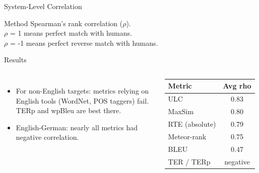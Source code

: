 \begin{frame}{System-Level Correlation}

\begin{block}{Method}
Spearman's rank correlation (\( \rho  \)). \\
    \( \rho  \) = 1 means perfect match with humans.\\
    \( \rho  \) = -1 means perfect reverse match with humans.
\end{block}

\vfill

\begin{block}{Results}
    \begin{columns}
        \begin{itemize}
            \item For non-English targets: metrics relying on English tools (WordNet, POS taggers) fail. TERp and wpBleu are best there.
            \item English-German: nearly all metrics had negative correlation.
        \end{itemize}
\begin{table}
\centering
\begin{tabular}{l c}
\toprule
Metric & Avg rho \\
\midrule
ULC & 0.83 \\
MaxSim & 0.80 \\
RTE (absolute) & 0.79 \\
Meteor-rank & 0.75 \\
BLEU & 0.47 \\
TER / TERp & negative \\
\bottomrule
\end{tabular}
\end{table}
\end{columns}
\end{block}


\end{frame}



